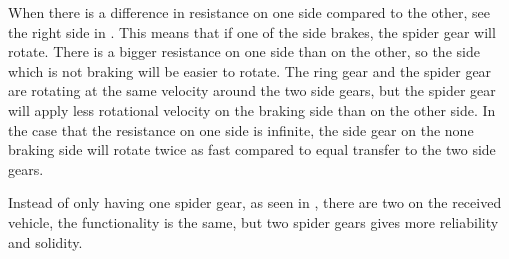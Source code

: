 When there is a difference in resistance on one side compared to the other, see the right side in . This means that if one of the side brakes, the spider gear will rotate. There is a bigger resistance on one side than on the other, so the side which is not braking will be easier to rotate. The ring gear and the spider gear are rotating at the same velocity around the two side gears, but the spider gear will apply less rotational velocity on the braking side than on the other side. In the case that the resistance on one side is infinite, the side gear on the none braking side will rotate twice as fast compared to equal transfer to the two side gears.

Instead of only having one spider gear, as seen in , there are two on the received vehicle, the functionality is the same, but two spider gears gives more reliability and solidity. 







